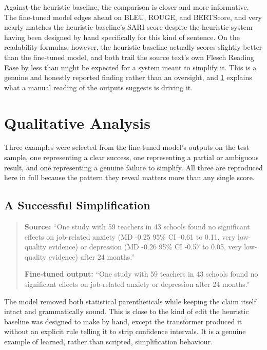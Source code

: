 Against the heuristic baseline, the comparison is closer and more informative. The fine-tuned model edges ahead on BLEU, ROUGE, and BERTScore, and very nearly matches the heuristic baseline's SARI score despite the heuristic system having been designed by hand specifically for this kind of sentence. On the readability formulas, however, the heuristic baseline actually scores slightly better than the fine-tuned model, and both trail the source text's own Flesch Reading Ease by less than might be expected for a system meant to simplify it. This is a genuine and honestly reported finding rather than an oversight, and \cref{sec:qualitative-discussion} explains what a manual reading of the outputs suggests is driving it.

\section{Qualitative Analysis}
\label{sec:qualitative-discussion}

Three examples were selected from the fine-tuned model's outputs on the test sample, one representing a clear success, one representing a partial or ambiguous result, and one representing a genuine failure to simplify. All three are reproduced here in full because the pattern they reveal matters more than any single score.

\subsection*{A Successful Simplification}

\begin{quote}
\textbf{Source:} ``One study with 59 teachers in 43 schools found no significant effects on job-related anxiety (MD -0.25 95\% CI -0.61 to 0.11, very low-quality evidence) or depression (MD -0.26 95\% CI -0.57 to 0.05, very low-quality evidence) after 24 months.''

\textbf{Fine-tuned output:} ``One study with 59 teachers in 43 schools found no significant effects on job-related anxiety or depression after 24 months.''
\end{quote}

The model removed both statistical parentheticals while keeping the claim itself intact and grammatically sound. This is close to the kind of edit the heuristic baseline was designed to make by hand, except the transformer produced it without an explicit rule telling it to strip confidence intervals. It is a genuine example of learned, rather than scripted, simplification behaviour.

